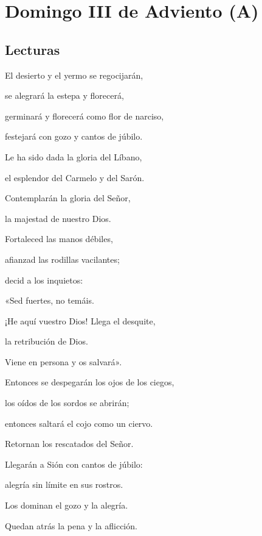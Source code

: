 \chapter{Domingo III de Adviento (A)}

	\section{Lecturas}
	


		
		\begin{readprose}
			El desierto y el yermo se regocijarán, 
			
			se alegrará la estepa y florecerá, 
			
			germinará y florecerá como flor de narciso, 
			
			festejará con gozo y cantos de júbilo. 
			
			Le ha sido dada la gloria del Líbano, 
			
			el esplendor del Carmelo y del Sarón. 
			
			Contemplarán la gloria del Señor,
			
			la majestad de nuestro Dios. 
			
			Fortaleced las manos débiles,
			
			afianzad las rodillas vacilantes;
			
			decid a los inquietos: 
			
			«Sed fuertes, no temáis.
			
			¡He aquí vuestro Dios! Llega el desquite, 
			
			la retribución de Dios. 
			
			Viene en persona y os salvará».
			
			Entonces se despegarán los ojos de los ciegos, 
			
			los oídos de los sordos se abrirán; 
			
			entonces saltará el cojo como un ciervo.
			
			Retornan los rescatados del Señor. 
			
			Llegarán a Sión con cantos de júbilo: 
			
			alegría sin límite en sus rostros. 
			
			Los dominan el gozo y la alegría. 
			
			Quedan atrás la pena y la aflicción.
		\end{readprose}

